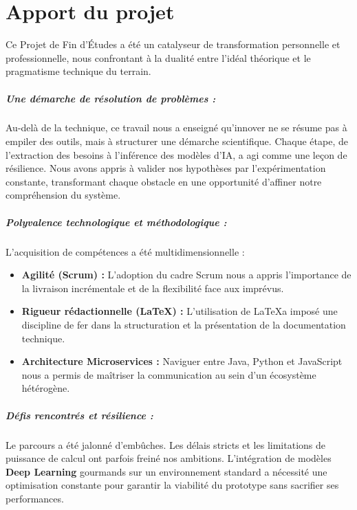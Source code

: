 \chapter*{Apport du projet}
\label{ch:apport}

Ce Projet de Fin d'Études a été un catalyseur de transformation personnelle et professionnelle, nous confrontant à la dualité entre l'idéal théorique et le pragmatisme technique du terrain.

\paragraph{Une démarche de résolution de problèmes :}
Au-delà de la technique, ce travail nous a enseigné qu'innover ne se résume pas à empiler des outils, mais à structurer une démarche scientifique. Chaque étape, de l'extraction des besoins à l'inférence des modèles d'IA, a agi comme une leçon de résilience. Nous avons appris à valider nos hypothèses par l'expérimentation constante, transformant chaque obstacle en une opportunité d'affiner notre compréhension du système.

\paragraph{Polyvalence technologique et méthodologique :}
L'acquisition de compétences a été multidimensionnelle :
\begin{itemize}[noitemsep, topsep=1pt]
    \item \textbf{Agilité (Scrum) :} L'adoption du cadre Scrum nous a appris l'importance de la livraison incrémentale et de la flexibilité face aux imprévus.
    \item \textbf{Rigueur rédactionnelle (\LaTeX) :} L'utilisation de \LaTeX a imposé une discipline de fer dans la structuration et la présentation de la documentation technique.
    \item \textbf{Architecture Microservices :} Naviguer entre Java, Python et JavaScript nous a permis de maîtriser la communication au sein d'un écosystème hétérogène.
\end{itemize}

\paragraph{Défis rencontrés et résilience :}
Le parcours a été jalonné d'embûches. Les délais stricts et les limitations de puissance de calcul ont parfois freiné nos ambitions. L'intégration de modèles \textbf{Deep Learning} gourmands sur un environnement standard a nécessité une optimisation constante pour garantir la viabilité du prototype sans sacrifier ses performances.

